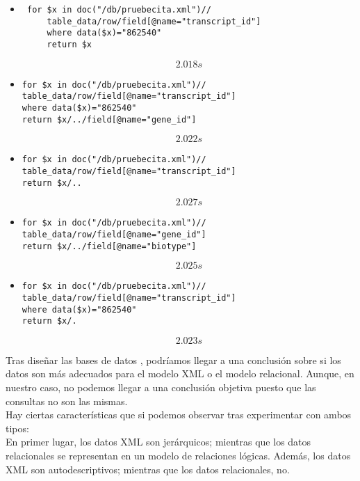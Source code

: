 \documentclass[12pt,a4paper]{article}
\begin{document}
\begin{itemize}
\item 
\begin{verbatim}
 for $x in doc("/db/pruebecita.xml")//
     table_data/row/field[@name="transcript_id"]
     where data($x)="862540"
     return $x
\end{verbatim}

$$2.018s$$

\item 
\begin{verbatim}
for $x in doc("/db/pruebecita.xml")//
table_data/row/field[@name="transcript_id"]
where data($x)="862540"
return $x/../field[@name="gene_id"]
\end{verbatim}

$$2.022s$$

\item 
\begin{verbatim}
for $x in doc("/db/pruebecita.xml")//
table_data/row/field[@name="transcript_id"]
return $x/..
\end{verbatim}

$$2.027s$$

\item 
\begin{verbatim}
for $x in doc("/db/pruebecita.xml")//
table_data/row/field[@name="gene_id"]
return $x/../field[@name="biotype"]
\end{verbatim}

$$2.025s$$

\item 
\begin{verbatim}
for $x in doc("/db/pruebecita.xml")//
table_data/row/field[@name="transcript_id"]
where data($x)="862540"
return $x/.
\end{verbatim}

$$2.023s$$


\end{itemize}

Tras diseñar las bases de datos , podríamos llegar a una conclusión sobre si los datos son más adecuados para el modelo XML o el modelo relacional. Aunque, en nuestro caso, no podemos llegar a una conclusión objetiva puesto que las consultas no son las mismas.\\

Hay ciertas características que si podemos observar tras experimentar con ambos tipos:\\

En primer lugar, los datos XML son jerárquicos; mientras que los datos relacionales se representan en un modelo de relaciones lógicas. Además, los datos XML son autodescriptivos; mientras que los datos relacionales, no.\\
\end{document}
